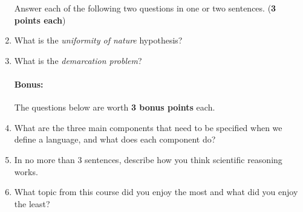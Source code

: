 \documentclass[10pt]{article}
\begin{document}
\begin{enumerate}


Answer each of the following two questions in one or two sentences. (\textbf{3 points each})

\setlength\itemsep{2cm}
\item What is the \textit{uniformity of nature} hypothesis?

\item What is the \textit{demarcation problem}?


\newpage

\paragraph{Bonus:} The questions below are worth \textbf{3 bonus points} each.

\setlength\itemsep{3cm}

  \item What are the three main components that need to be specified when we define a language, and what does each component do?

  \item In no more than 3 sentences, describe how you think scientific reasoning works.

  \item What topic from this course did you enjoy the most and what did you enjoy the least?
\end{enumerate}
\end{document}
